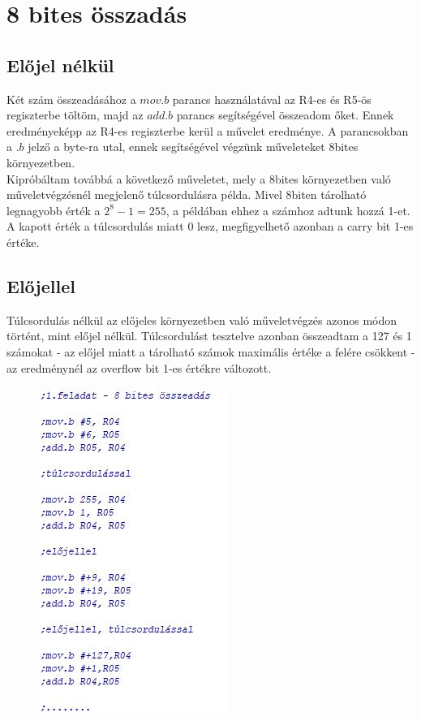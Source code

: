 \documentclass[10pt, conference,a4paper]{ITKproc}
\begin{document}
\section{8 bites összadás}
\subsection{Előjel nélkül}
Két szám összeadásához a $mov.b$ parancs használatával az R4-es és R5-ös regiszterbe töltöm, majd az $add.b$ parancs segítségével összeadom őket. Ennek eredményeképp az R4-es regiszterbe kerül a művelet eredménye. A parancsokban a $.b$ jelző a byte-ra utal, ennek segítségével végzünk műveleteket 8bites környezetben. \\
Kipróbáltam továbbá a következő műveletet, mely a 8bites környezetben való műveletvégzésnél megjelenő túlcsordulásra példa. Mivel 8biten tárolható legnagyobb érték a $2^8 - 1 = 255$, a példában ehhez a számhoz adtunk hozzá 1-et. A kapott érték a túlcsordulás miatt 0 lesz, megfigyelhető azonban a carry bit 1-es értéke. 
\subsection{Előjellel}
Túlcsordulás nélkül az előjeles környezetben való műveletvégzés azonos módon történt, mint előjel nélkül. Túlcsordulást tesztelve azonban összeadtam a 127 és 1 számokat - az előjel miatt a tárolható számok maximális értéke a felére csökkent - az eredménynél az overflow bit 1-es értékre változott. 

\begin{figure}[h]
\includegraphics[scale=0.5]{1feladat}
\centering

\end{figure}
\end{document}
